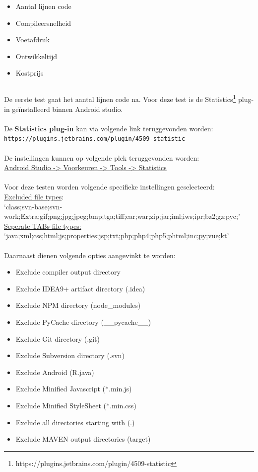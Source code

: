 \begin{itemize}
    \item Aantal lijnen code
    \item Compileersnelheid
    \item Voetafdruk
    \item Ontwikkeltijd
    \item Kostprijs
\end{itemize}

\subsection{}
\label{sec:M-test-lijnen-code}
De eerste test gaat het aantal lijnen code na. Voor deze test is de Statistics\footnote{https://plugins.jetbrains.com/plugin/4509-statistic} plug-in geïnstalleerd binnen Android studio.
\\ \\
De \textbf{Statistics plug-in} kan via volgende link teruggevonden worden:\\
\verb*|https://plugins.jetbrains.com/plugin/4509-statistic|
\\ \\
De instellingen kunnen op volgende plek teruggevonden worden: \\ 
\underline{Android Studio -> Voorkeuren -> Tools -> Statistics}
\\ \\
Voor deze testen worden volgende specifieke instellingen geselecteerd: \\
\underline{Excluded file types}:\\ `class;svn-base;svn-work;Extra;gif;png;jpg;jpeg;bmp;tga;tiff;ear;war;zip;jar;iml;iws;ipr;bz2;gz;pyc;'
\underline{Seperate TABs file types:}\\
`java;xml;css;html;js;properties;jsp;txt;php;php4;php5;phtml;inc;py;vue;kt'
\\ \\
Daarnaast dienen volgende opties aangevinkt te worden:\\
\begin{itemize}
    \item Exclude compiler output directory
    \item Exclude IDEA9+ artifact directory (.idea)
    \item Exclude NPM directory (node\_modules)
    \item Exclude PyCache directory (\_\_pycache\_\_)
    \item Exclude Git directory (.git)
    \item Exclude Subversion directory (.svn)
    \item Exclude Android (R.java)
    \item Exclude Minified Javascript (*.min.js)
    \item Exclude Minified StyleSheet (*.min.css)
    \item Exclude all directories starting with (.)
    \item Exclude MAVEN output directories (target)
\end{itemize}

